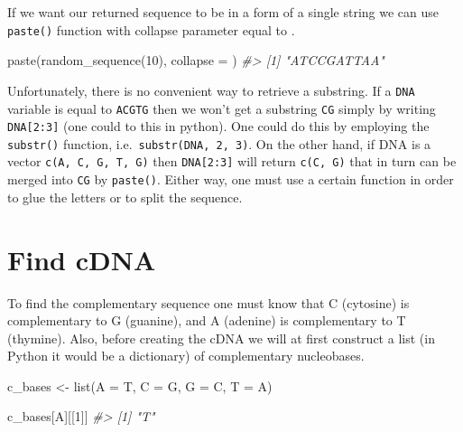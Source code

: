 \documentclass[
]{book}
\newenvironment{Shaded}{\begin{snugshade}}{\end{snugshade}}
\newcommand{\AttributeTok}[1]{\textcolor[rgb]{0.77,0.63,0.00}{#1}}
\newcommand{\CommentTok}[1]{\textcolor[rgb]{0.56,0.35,0.01}{\textit{#1}}}
\newcommand{\DecValTok}[1]{\textcolor[rgb]{0.00,0.00,0.81}{#1}}
\newcommand{\FunctionTok}[1]{\textcolor[rgb]{0.00,0.00,0.00}{#1}}
\newcommand{\NormalTok}[1]{#1}
\newcommand{\OtherTok}[1]{\textcolor[rgb]{0.56,0.35,0.01}{#1}}
\newcommand{\StringTok}[1]{\textcolor[rgb]{0.31,0.60,0.02}{#1}}
\begin{document}
If we want our returned sequence to be in a form of a single string we can use \texttt{paste()} function with collapse parameter equal to \texttt{\textquotesingle{}\textquotesingle{}}.

\begin{Shaded}
\begin{Highlighting}[]
\FunctionTok{paste}\NormalTok{(}\FunctionTok{random\_sequence}\NormalTok{(}\DecValTok{10}\NormalTok{), }\AttributeTok{collapse =} \StringTok{\textquotesingle{}\textquotesingle{}}\NormalTok{)}
\CommentTok{\#\textgreater{} [1] "ATCCGATTAA"}
\end{Highlighting}
\end{Shaded}

Unfortunately, there is no convenient way to retrieve a substring. If a \texttt{DNA} variable is equal to \texttt{\textquotesingle{}ACGTG\textquotesingle{}} then we won't get a substring \texttt{\textquotesingle{}CG\textquotesingle{}} simply by writing \texttt{DNA{[}2:3{]}} (one could to this in python). One could do this by employing the \texttt{substr()} function, i.e.~\texttt{substr(DNA,\ 2,\ 3)}. On the other hand, if DNA is a vector \texttt{c(\textquotesingle{}A\textquotesingle{},\ \textquotesingle{}C\textquotesingle{},\ \textquotesingle{}G\textquotesingle{},\ \textquotesingle{}T\textquotesingle{},\ \textquotesingle{}G\textquotesingle{})} then \texttt{DNA{[}2:3{]}} will return \texttt{c(\textquotesingle{}C\textquotesingle{},\ \textquotesingle{}G\textquotesingle{})} that in turn can be merged into \texttt{\textquotesingle{}CG\textquotesingle{}} by \texttt{paste()}. Either way, one must use a certain function in order to glue the letters or to split the sequence.

\hypertarget{find-cdna}{%
\section{Find cDNA}\label{find-cdna}}

To find the complementary sequence one must know that C (cytosine) is complementary to G (guanine), and A (adenine) is complementary to T (thymine). Also, before creating the cDNA we will at first construct a list (in Python it would be a dictionary) of complementary nucleobases.

\begin{Shaded}
\begin{Highlighting}[]
\NormalTok{c\_bases }\OtherTok{\textless{}{-}} \FunctionTok{list}\NormalTok{(}\StringTok{\textquotesingle{}A\textquotesingle{}} \OtherTok{=} \StringTok{\textquotesingle{}T\textquotesingle{}}\NormalTok{, }\StringTok{\textquotesingle{}C\textquotesingle{}} \OtherTok{=} \StringTok{\textquotesingle{}G\textquotesingle{}}\NormalTok{, }\StringTok{\textquotesingle{}G\textquotesingle{}} \OtherTok{=} \StringTok{\textquotesingle{}C\textquotesingle{}}\NormalTok{, }\StringTok{\textquotesingle{}T\textquotesingle{}} \OtherTok{=} \StringTok{\textquotesingle{}A\textquotesingle{}}\NormalTok{)}

\NormalTok{c\_bases[}\StringTok{\textquotesingle{}A\textquotesingle{}}\NormalTok{][[}\DecValTok{1}\NormalTok{]]}
\CommentTok{\#\textgreater{} [1] "T"}
\end{Highlighting}
\end{Shaded}
\end{document}
